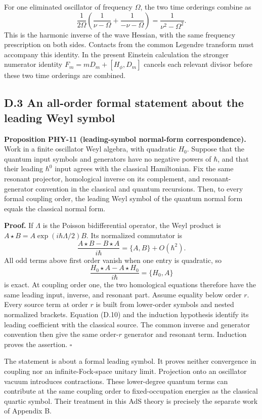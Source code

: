\documentclass[a4paper,11pt]{article}
\numberwithin{equation}{section}
\begin{document}
For one eliminated oscillator of frequency \(\Omega\), the two time orderings combine as \[
\frac1{2\Omega}
\left(\frac1{\nu-\Omega}+\frac1{-\nu-\Omega}\right)
=\frac1{\nu^2-\Omega^2}.
\tag{D.9}
\] This is the harmonic inverse of the wave Hessian, with the same frequency prescription on both sides. Contacts from the common Legendre transform must accompany this identity. In the present Einstein calculation the stronger numerator identity \(F_m=mD_m+[H_\phi,D_m]\) cancels each relevant divisor before these two time orderings are combined.

\hypertarget{d.3-an-all-order-formal-statement-about-the-leading-weyl-symbol}{%
\subsection{D.3 An all-order formal statement about the leading Weyl symbol}\label{d.3-an-all-order-formal-statement-about-the-leading-weyl-symbol}}

\textbf{Proposition PHY-11 (leading-symbol normal-form correspondence).} Work in a finite oscillator Weyl algebra, with quadratic \(H_0\). Suppose that the quantum input symbols and generators have no negative powers of \(\hbar\), and that their leading \(\hbar^0\) input agrees with the classical Hamiltonian. Fix the same resonant projector, homological inverse on its complement, and resonant-generator convention in the classical and quantum recursions. Then, to every formal coupling order, the leading Weyl symbol of the quantum normal form equals the classical normal form.

\textbf{Proof.} If \(\Lambda\) is the Poisson bidifferential operator, the Weyl product is \(A\star B=A\exp(i\hbar\Lambda/2)B\). Its normalized commutator is \[
\frac{A\star B-B\star A}{i\hbar}
=\{A,B\}+O(\hbar^2).
\tag{D.10}
\] All odd terms above first order vanish when one entry is quadratic, so \[
\frac{H_0\star A-A\star H_0}{i\hbar}
=\{H_0,A\}
\tag{D.11}
\] is exact. At coupling order one, the two homological equations therefore have the same leading input, inverse, and resonant part. Assume equality below order \(r\). Every source term at order \(r\) is built from lower-order symbols and nested normalized brackets. Equation (D.10) and the induction hypothesis identify its leading coefficient with the classical source. The common inverse and generator convention then give the same order-\(r\) generator and resonant term. Induction proves the assertion. \(\square\)

The statement is about a formal leading symbol. It proves neither convergence in coupling nor an infinite-Fock-space unitary limit. Projection onto an oscillator vacuum introduces contractions. These lower-degree quantum terms can contribute at the same coupling order to fixed-occupation energies as the classical quartic symbol. Their treatment in this AdS theory is precisely the separate work of Appendix B.
\end{document}
